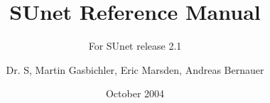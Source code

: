 \documentclass[twoside]{report}
\begin{document}
\frontmatter 
\title{SUnet Reference Manual}
\subtitle{For SUnet release 2.1}
\author{Dr. S\raisebox{1ex}{2}, Martin Gasbichler, Eric Marsden, Andreas Bernauer}
\date{October 2004}

\mainmatter
\maketitle

\tableofcontents
















\backmatter
\printindex
\end{document}

